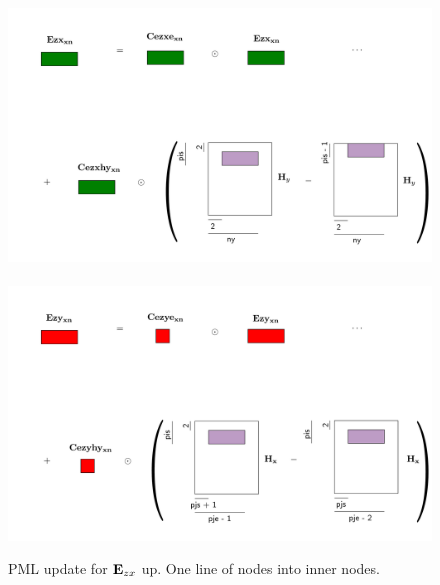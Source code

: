 \documentclass[a4paper,12pt]{article}
\begin{document}
\begin{figure}
\centering
\includegraphics[width=1\textwidth]{../pics/tikz/svg/pml-color/Ezx-xn.pdf}
~
\includegraphics[width=1\textwidth]{../pics/tikz/svg/pml-color/Ezy-xn.pdf}
\caption{PML update for ${\bf E}_{zx}$ up. One line of nodes into inner nodes.}
\end{figure}
%
\end{document}
